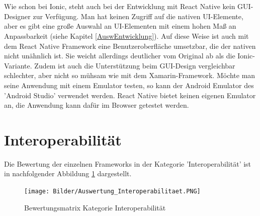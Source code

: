\\
\\
Wie schon bei Ionic, steht auch bei der Entwicklung mit React Native kein GUI-Designer zur Verfügung. Man hat keinen Zugriff auf die nativen UI-Elemente, aber es gibt eine große Auswahl an UI-Elementen mit einem hohen Maß an Anpassbarkeit (siehe Kapitel \ref{AuswEntwicklung}). Auf diese Weise ist auch mit dem React Native Framework eine Benutzeroberfläche umsetzbar, die der nativen nicht unähnlich ist. Sie weicht allerdings deutlicher vom Original ab als die Ionic-Variante. Zudem ist auch die Unterstützung beim GUI-Design vergleichbar schlechter, aber nicht so mühsam wie mit dem Xamarin-Framework. Möchte man seine Anwendung mit einem Emulator testen, so kann der Android Emulator des 'Android Studio' verwendet werden. React Native bietet keinen eigenen Emulator an, die Anwendung kann dafür im Browser getestet werden. 

\section{Interoperabilität} \label{AuswInterop}

Die Bewertung der einzelnen Frameworks in der Kategorie 'Interoperabilität' ist in nachfolgender Abbildung \ref{fig:AuswInterop} dargestellt.

\begin{figure}[h]
	\centering
	\texttt{[image: Bilder/Auswertung\_Interoperabilitaet.PNG]}
	\caption{Bewertungsmatrix Kategorie Interoperabilität}
	\label{fig:AuswInterop}
\end{figure}

